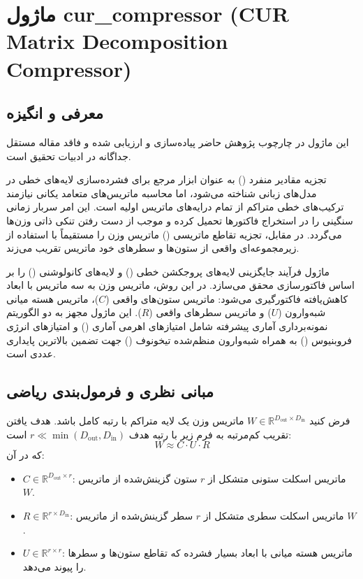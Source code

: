 \section{ماژول cur\_compressor (CUR Matrix Decomposition Compressor)}
\label{sec:module_cur_compressor}

\subsection{معرفی و انگیزه}
این ماژول در چارچوب پژوهش حاضر پیاده‌سازی و ارزیابی شده و فاقد مقاله مستقل جداگانه در ادبیات تحقیق است.

تجزیه مقادیر منفرد () به عنوان ابزار مرجع برای فشرده‌سازی لایه‌های خطی در مدل‌های زبانی شناخته می‌شود، اما محاسبه ماتریس‌های متعامد یکانی نیازمند ترکیب‌های خطی متراکم از تمام درایه‌های ماتریس اولیه است. این امر سربار زمانی سنگینی را در استخراج فاکتورها تحمیل کرده و موجب از دست رفتن تنکی ذاتی وزن‌ها می‌گردد. در مقابل، تجزیه تقاطع ماتریسی () ماتریس وزن را مستقیماً با استفاده از زیرمجموعه‌ای واقعی از ستون‌ها و سطرهای خود ماتریس تقریب می‌زند.

ماژول  فرآیند جایگزینی لایه‌های پروجکشن خطی () و لایه‌های کانولوشنی () را بر اساس فاکتورسازی  محقق می‌سازد. در این روش، ماتریس وزن به سه ماتریس با ابعاد کاهش‌یافته فاکتورگیری می‌شود: ماتریس ستون‌های واقعی ($C$)، ماتریس هسته میانی شبه‌وارون ($U$) و ماتریس سطرهای واقعی ($R$). این ماژول مجهز به دو الگوریتم نمونه‌برداری آماری پیشرفته شامل امتیازهای اهرمی آماری () و امتیازهای انرژی فروبنیوس () به همراه شبه‌وارون منظم‌شده تیخونوف () جهت تضمین بالاترین پایداری عددی است.

\subsection{مبانی نظری و فرمول‌بندی ریاضی}
فرض کنید $W \in \mathbb{R}^{D_{\text{out}} \times D_{\text{in}}}$ ماتریس وزن یک لایه متراکم با رتبه کامل باشد. هدف یافتن تقریب کم‌مرتبه به فرم زیر با رتبه هدف $r \ll \min(D_{\text{out}}, D_{\text{in}})$ است:
\begin{equation}
W \approx C \cdot U \cdot R
\end{equation}
که در آن:
\begin{itemize}
    \item $C \in \mathbb{R}^{D_{\text{out}} \times r}$: ماتریس اسکلت ستونی متشکل از $r$ ستون گزینش‌شده از ماتریس $W$.
    \item $R \in \mathbb{R}^{r \times D_{\text{in}}}$: ماتریس اسکلت سطری متشکل از $r$ سطر گزینش‌شده از ماتریس $W$.
    \item $U \in \mathbb{R}^{r \times r}$: ماتریس هسته میانی با ابعاد بسیار فشرده که تقاطع ستون‌ها و سطرها را پیوند می‌دهد.
\end{itemize}

